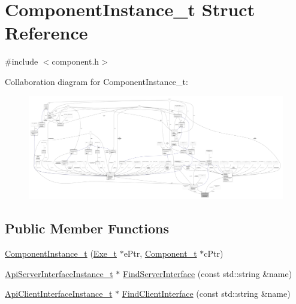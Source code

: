 \hypertarget{struct_component_instance__t}{}\section{Component\+Instance\+\_\+t Struct Reference}
\label{struct_component_instance__t}


{\ttfamily \#include $<$component.\+h$>$}



Collaboration diagram for Component\+Instance\+\_\+t\+:
\nopagebreak
\begin{figure}[H]
\begin{center}
\leavevmode
\includegraphics[width=350pt]{struct_component_instance__t__coll__graph}
\end{center}
\end{figure}
\subsection*{Public Member Functions}
\begin{DoxyCompactItemize}
\item 
\hyperlink{struct_component_instance__t_a4237272d2557385152eeeabf1762f9b0}{Component\+Instance\+\_\+t} (\hyperlink{struct_exe__t}{Exe\+\_\+t} $\ast$e\+Ptr, \hyperlink{struct_component__t}{Component\+\_\+t} $\ast$c\+Ptr)
\item 
\hyperlink{struct_api_server_interface_instance__t}{Api\+Server\+Interface\+Instance\+\_\+t} $\ast$ \hyperlink{struct_component_instance__t_ad07d18141916632207106cccf263c98b}{Find\+Server\+Interface} (const std\+::string \&name)
\item 
\hyperlink{struct_api_client_interface_instance__t}{Api\+Client\+Interface\+Instance\+\_\+t} $\ast$ \hyperlink{struct_component_instance__t_ae47eb8cff3762ce840413ee3c86b3b92}{Find\+Client\+Interface} (const std\+::string \&name)
\end{DoxyCompactItemize}
